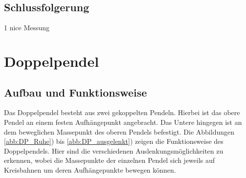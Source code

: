 \documentclass[11pt,a4paper,titlepage, ngerman]{article}
\begin{document}
		\subsection{Schlussfolgerung}
			
			1 nice Messung				
			
	\section{Doppelpendel}
	
		\subsection{Aufbau und Funktionsweise}	
			
			Das Doppelpendel besteht aus zwei gekoppelten Pendeln. Hierbei ist das obere Pendel an einem festen Aufhängepunkt angebracht. Das Untere  hingegen ist an dem beweglichen Massepunkt des oberen Pendels befestigt. Die Abbildungen \ref{abb:DP_Ruhe}) bis \ref{abb:DP_ausgelenkt}) zeigen die Funktionsweise des Doppelpendels. Hier sind die verschiedenen Auslenkungsmöglichkeiten zu erkennen, wobei die Massepunkte der einzelnen Pendel sich jeweils auf Kreisbahnen um deren Aufhängepunkte bewegen können.	
\end{document}
